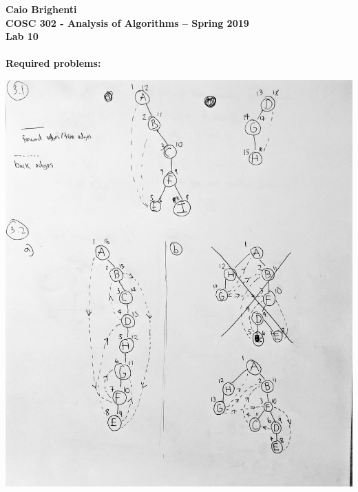 \documentclass{article}
\begin{document}
\noindent \textbf{Caio Brighenti }\\
\noindent \textbf{COSC 302 - Analysis of Algorithms -- Spring 2019}\\%
\noindent \textbf{Lab 10}\vspace{1em}\\
\\ \textbf{Required problems:}
	   \begin{center}
	   \includegraphics[scale=0.28]{1.jpg} \\

\end{center}
\end{document}
